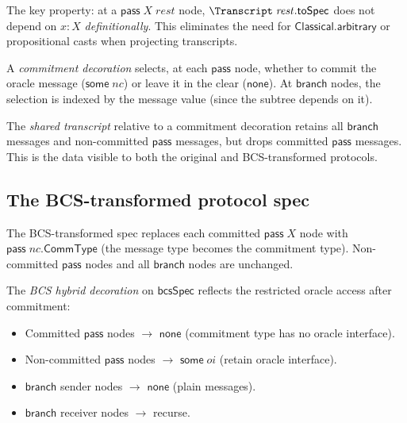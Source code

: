 The key property: at a $\mathsf{pass}\;X\;\mathit{rest}$ node,
$\Transcript\;\mathit{rest}.\mathsf{toSpec}$ does not depend on
$x : X$ \emph{definitionally}.
This eliminates the need for $\mathsf{Classical.arbitrary}$ or propositional
casts when projecting transcripts.

\begin{definition}[CommitDeco]
  \label{bcs:commit-deco}
  A \emph{commitment decoration} selects, at each $\mathsf{pass}$ node,
  whether to commit the oracle message ($\mathsf{some}\;\mathit{nc}$) or
  leave it in the clear ($\mathsf{none}$).
  At $\mathsf{branch}$ nodes, the selection is indexed by the message value
  (since the subtree depends on it).
\end{definition}

\begin{definition}[SharedTranscript]
  \label{bcs:shared-transcript}
  The \emph{shared transcript} relative to a commitment decoration retains
  all $\mathsf{branch}$ messages and non-committed $\mathsf{pass}$ messages,
  but drops committed $\mathsf{pass}$ messages.
  This is the data visible to both the original and BCS-transformed
  protocols.
\end{definition}

\subsection{The BCS-transformed protocol spec}

\begin{definition}[bcsSpec]
  \label{bcs:bcs-spec}
  The BCS-transformed spec replaces each committed $\mathsf{pass}\;X$ node
  with $\mathsf{pass}\;\mathit{nc}.\mathsf{CommType}$ (the message type becomes
  the commitment type).
  Non-committed $\mathsf{pass}$ nodes and all $\mathsf{branch}$ nodes are
  unchanged.
\end{definition}

\begin{definition}[bcsHybridDeco]
  \label{bcs:bcs-hybrid-deco}
  The \emph{BCS hybrid decoration} on $\mathsf{bcsSpec}$ reflects the
  restricted oracle access after commitment:
  \begin{itemize}
    \item Committed $\mathsf{pass}$ nodes $\to$ $\mathsf{none}$
      (commitment type has no oracle interface).
    \item Non-committed $\mathsf{pass}$ nodes $\to$
      $\mathsf{some}\;\mathit{oi}$ (retain oracle interface).
    \item $\mathsf{branch}$ sender nodes $\to$ $\mathsf{none}$
      (plain messages).
    \item $\mathsf{branch}$ receiver nodes $\to$ recurse.
  \end{itemize}
\end{definition}

